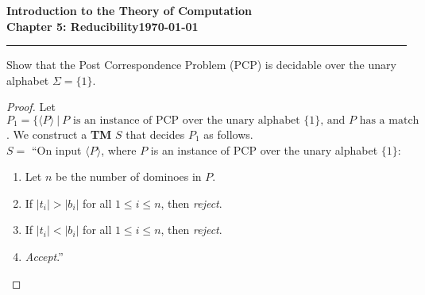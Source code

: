 \documentclass[11pt]{article}
\newcommand{\dated}{\today}
\begin{document}
\textbf{Introduction to the Theory of
Computation}\hfill\textbf{\myname}\\[0.01in]
\textbf{Chapter 5: Reducibility}\hfill\textbf{\dated}\\
\smallskip\hrule\bigskip

\begin{problem}{5.17}
Show that the Post Correspondence Problem (PCP) is decidable over the unary alphabet $\Sigma = \{1\}$.
\end{problem}

\begin{proof}
Let $P_1 = \{\langle P \rangle \ | \ P \text{ is an instance of PCP over the unary alphabet } \{1\} \text{, and } P \text{ has a match}$. We construct a \textbf{TM} $S$ that decides $P_1$ as follows. \\

$S =$ \textquotedblleft On input $\langle P \rangle$, where $P$ is an instance of PCP over the unary alphabet $\{1\}$:
\begin{enumerate}
\item Let $n$ be the number of dominoes in $P$.
\item If $|t_i| > |b_i|$ for all $1 \leq i \leq n$, then \textit{reject}.
\item If $|t_i| < |b_i|$ for all $1 \leq i \leq n$, then \textit{reject}.
\item \textit{Accept}.\textquotedblright
\end{enumerate}
\end{proof}
\end{document}
